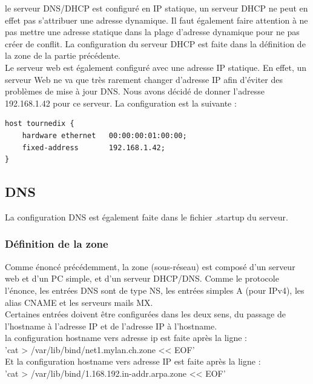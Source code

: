 \documentclass{article}
\begin{document}
le serveur DNS/DHCP est configuré en IP statique, un serveur DHCP ne peut en effet pas s'attribuer une adresse dynamique. Il faut également faire attention à ne pas mettre une adresse statique dans la plage d'adresse dynamique pour ne pas créer de conflit. La configuration du serveur DHCP est faite dans la définition de la zone de la partie précédente.\\

Le serveur web est également configuré avec une adresse IP statique. En effet, un serveur Web ne va que très rarement changer d'adresse IP afin d'éviter des problèmes de mise à jour DNS. Nous avons décidé de donner l'adresse 192.168.1.42 pour ce serveur. La configuration est la suivante : \\

\begin{lstlisting}
host tournedix {
	hardware ethernet	00:00:00:01:00:00;
	fixed-address		192.168.1.42;
}
\end{lstlisting}

\subsection{DNS}

La configuration DNS est également faite dans le fichier .startup du serveur.

\subsubsection{Définition de la zone}

Comme énoncé précédemment, la zone (sous-réseau) est composé d'un serveur web et d'un PC simple, et d'un serveur DHCP/DNS. Comme le protocole l'énonce, les entrées DNS sont de type NS, les entrées simples A (pour IPv4), les alias CNAME et les serveurs mails MX. \cite{cours}\\

Certaines entrées doivent être configurées dans les deux sens, du passage de l'hostname à l'adresse IP et de l'adresse IP à l'hostname.\\

la configuration hostname vers adresse ip est faite après la ligne : \\
'cat > /var/lib/bind/net1.mylan.ch.zone << EOF' \\

Et la configuration hostname vers adresse IP est faite après la ligne :\\
 'cat > /var/lib/bind/1.168.192.in-addr.arpa.zone << EOF'
\end{document}
